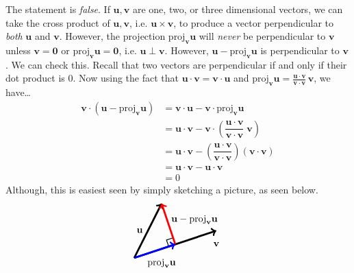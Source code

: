 \documentclass[11pt,letterpaper]{article}
\begin{document}
\sol The statement is \textit{false}. If $\mathbf{u}, \mathbf{v}$ are one, two, or three dimensional vectors, we can take the cross product of $\mathbf{u}, \mathbf{v}$, i.e. $\mathbf{u} \times \mathbf{v}$, to produce a vector perpendicular to \textit{both} $\mathbf{u}$ and $\mathbf{v}$. However, the projection $\text{proj}_{\mathbf{v}} \mathbf{u}$ will \textit{never} be perpendicular to $\mathbf{v}$ unless $\mathbf{v}= \mathbf{0}$ or $\text{proj}_{\mathbf{v}} \mathbf{u}= \mathbf{0}$, i.e. $\mathbf{u} \perp \mathbf{v}$. However, $\mathbf{u} - \text{proj}_{\mathbf{v}} \mathbf{u}$ is perpendicular to $\mathbf{v}$. We can check this. Recall that two vectors are perpendicular if and only if their dot product is 0. Now using the fact that $\mathbf{u} \cdot \mathbf{v}= \mathbf{v} \cdot \mathbf{u}$ and $\text{proj}_{\mathbf{v}} \mathbf{u}= \frac{\mathbf{u} \cdot \mathbf{v}}{\mathbf{v} \cdot \mathbf{v}} \, \mathbf{v}$, we have\dots
	\[
	\begin{aligned}
	\mathbf{v} \cdot ( \mathbf{u} - \text{proj}_{\mathbf{v}} \mathbf{u} )&= \mathbf{v} \cdot \mathbf{u} - \mathbf{v} \cdot \text{proj}_{\mathbf{v}} \mathbf{u} \\
	&= \mathbf{u} \cdot \mathbf{v} - \mathbf{v} \cdot \left( \dfrac{\mathbf{u} \cdot \mathbf{v}}{\mathbf{v} \cdot \mathbf{v}} \; \mathbf{v} \right) \\
	&= \mathbf{u} \cdot \mathbf{v} - \left( \dfrac{\mathbf{u} \cdot \mathbf{v}}{\mathbf{v} \cdot \mathbf{v}} \right) ( \mathbf{v} \cdot \mathbf{v} ) \\
	&= \mathbf{u} \cdot \mathbf{v} - \mathbf{u} \cdot \mathbf{v} \\
	&= 0
	\end{aligned} 
	\]
Although, this is easiest seen by simply sketching a picture, as seen below.
	\[
	\begin{tikzpicture}
	\draw[line width=0.07cm,->] (0,0) -- (3,1);
	\draw[line width=0.07cm,->] (0,0) -- (1,2);
	\draw[line width=0.03cm] (1.26,0.42) -- (1.18,0.658) -- (1.42,0.737);
	\draw[line width=0.07cm,->,red] (3/2,1/2) -- (1,2);
	\draw[line width=0.07cm,->,blue] (0,0) -- (3/2,1/2);
	\node at (3,0.5) {$\mathbf{v}$};
	\node at (0.2,1) {$\mathbf{u}$};
	\node at (1,-0.2) {$\text{proj}_{\mathbf{v}} \mathbf{u}$};
	\node at (2.2,1.4) {$\mathbf{u} - \text{proj}_{\mathbf{v}} \mathbf{u}$};
	\end{tikzpicture}
	\] \par\vspace{1.3cm}
\end{document}
